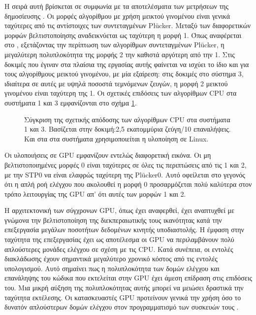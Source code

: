 Η σειρά αυτή βρίσκεται σε συμφωνία με τα αποτελέσματα των μετρήσεων της δημοσίευσης \cite{PlatisTheoharis03}. Οι μορφές αλγορίθμου με χρήση μεικτού γινομένου είναι γενικά ταχύτερες από τις αντίστοιχες των συντεταγμένων Plücker. Μεταξύ των διαφορετικών μορφών βελτιστοποίησης αναδεικνύεται ως ταχύτερη η μορφή 1. Όπως αναφέρεται στο \cite{PlatisTheoharis03}, εξετάζοντας την περίπτωση των αλγορίθμων συντεταγμένων Plücker, η μεγαλύτερη πολυπλοκότητα της μορφής 2 την καθιστά αργότερη από την 1. Στις δοκιμές που έγιναν στα πλαίσια της εργασίας αυτής φαίνεται να ισχύει το ίδιο και για τους αλγορίθμους μεικτού γινομένου, με μία εξαίρεση: στις δοκιμές στο σύστημα 3, ιδιαίτερα σε αυτές με υψηλά ποσοστά τεμνόμενων ζευγών, η μορφή 2 μεικτού γινομένου είναι ταχύτερη της 1. Οι σχετικές επιδόσεις των αλγορίθμων CPU στα συστήματα 1 και 3 εμφανίζονται στο σχήμα \ref{effcpuexample}.

\begin{figure}[h!]
\begin{center}
\scalebox{0.9}
{

}
\scalebox{0.9}
{

}
\end{center}
\caption{Σύγκριση της σχετικής απόδοσης των αλγορίθμων CPU στα συστήματα 1 και 3. Βασίζεται στην δοκιμή:2,5 εκατομμύρια ζεύγη/10 επαναλήψεις. Και στα στα συστήματα χρησιμοποιείται η υλοποίηση σε Linux.}
\label{effcpuexample}
\end{figure}

Οι υλοποιήσεις σε GPU εμφανίζουν εντελώς διαφορετική εικόνα. Οι μη βελτιστοποιημένες μορφές 0 είναι ταχύτερες σε όλες τις περιπτώσεις από τις 1 και 2, με την STP0 να είναι ελαφρώς ταχύτερη της Plücker0. Αυτό οφείλεται στο γεγονός ότι η απλή ροή ελέγχου που ακολουθεί η μορφή 0 προσαρμόζεται πολύ καλύτερα στον τρόπο λειτουργίας της GPU απ' ότι αυτές των μορφών 1 και 2.

Η αρχιτεκτονική των σύγχρονων GPU, όπως έχει αναφερθεί, έχει αναπτυχθεί με γνώμονα την βελτιστοποίηση της διεκπεραιωτικής τους ικανότητας κατά την επεξεργασία μεγάλων ποσοτήτων δεδομένων κινητής υποδιαστολής. Η έμφαση στην ταχύτητα της επεξεργασίας έχει ως αποτέλεσμα οι GPU να περιλαμβάνουν πολύ απλούστερες μονάδες ελέγχου σε σχέση με τις CPU. Κατά συνέπεια, οι εντολές διακλάδωσης έχουν σημαντικά μεγαλύτερο χρονικό κόστος από τις εντολές υπολογισμού. Αυτό σημαίνει πως η πολυπλοκότητα των δομών ελέγχου και επανάληψης του κώδικα που εκτελείται στην GPU έχει άμεση επίδραση στις επιδόσεις του. Μια μικρή αύξηση της πολυπλοκότητας αυτής μπορεί να μειώσει δραστικά την ταχύτητα εκτέλεσης. Οι κατασκευαστές GPU προτείνουν γενικά την χρήση όσο το δυνατόν απλούστερων δομών ελέγχου στον προγραμματισμό των συσκευών τους \cite{ATIOpenCL}.

